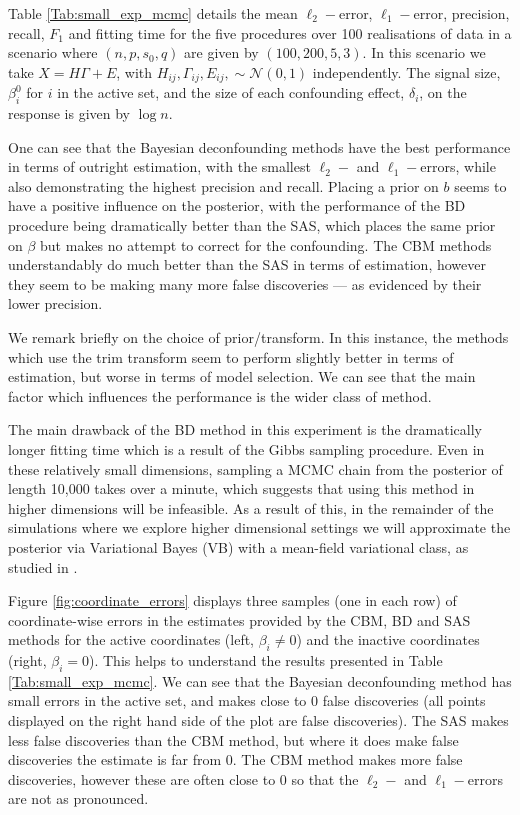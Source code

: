\documentclass[11pt]{article}
\numberwithin{equation}{section}
\begin{document}
 Table \ref{Tab:small_exp_mcmc} details the mean $\ell_2-$error, $\ell_1-$error, precision, recall, $F_1$ and fitting time for the five procedures over 100 realisations of data in a scenario where $(n, p, s_0, q)$ are given by $(100, 200, 5, 3)$. In this scenario we take $X = H \Gamma + E$, with $H_{ij}, \Gamma_{ij}, E_{ij}, \sim \mathcal{N}(0, 1)$ independently. The signal size, $\beta_i^0$ for $i$ in the active set, and the size of each confounding effect, $\delta_i$, on the response is given by $\log n$. 
 
 One can see that the Bayesian deconfounding methods have the best performance in terms of outright estimation, with the smallest $\ell_2-$ and $\ell_1-$errors, while also demonstrating the highest precision and recall. Placing a prior on $b$ seems to have a positive influence on the posterior, with the performance of the BD procedure being dramatically better than the SAS, which places the same prior on $\beta$ but makes no attempt to correct for the confounding. The CBM methods understandably do much better than the SAS in terms of estimation, however they seem to be making many more false discoveries --- as evidenced by their lower precision. 
  
We remark briefly on the choice of prior/transform. In this instance, the methods which use the trim transform seem to perform slightly better in terms of estimation, but worse in terms of model selection. We can see that the main factor which influences the performance is the wider class of method.
 
 The main drawback of the BD method in this experiment is the dramatically longer fitting time which is a result of the Gibbs sampling procedure. Even in these relatively small dimensions, sampling a MCMC chain from the posterior of length 10,000 takes over a minute, which suggests that using this method in higher dimensions will be infeasible. As a result of this, in the remainder of the simulations where we explore higher dimensional settings we will approximate the posterior via Variational Bayes (VB) with a mean-field variational class, as studied in \cite{Ray_Szabo_2020}.
   
  Figure \ref{fig:coordinate_errors} displays three samples (one in each row) of coordinate-wise errors in the estimates provided by the CBM, BD and SAS methods for the active coordinates (left, $\beta_i \neq 0$) and the inactive coordinates (right, $\beta_i = 0$). This helps to understand the results presented in Table \ref{Tab:small_exp_mcmc}. We can see that the Bayesian deconfounding method has small errors in the active set, and makes close to 0 false discoveries (all points displayed on the right hand side of the plot are false discoveries).  The SAS makes less false discoveries than the CBM method, but where it does make false discoveries the estimate is far from 0. The CBM method makes more false discoveries, however these are often close to 0 so that the $\ell_2-$ and $\ell_1-$errors are not as pronounced.
\end{document}
